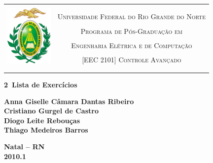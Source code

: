 \begin{titlepage}
\begin{center}

\begin{table}[h]
\centering
\setlength{\arrayrulewidth}{3.5\arrayrulewidth}
    \begin{tabular}{cc}
    \hline\\
    \multirow{5}{*}{\includegraphics[height=3cm]{imgs/ufrn}}&\\
    & \textsc{Universidade Federal do Rio Grande do Norte}\\
    & \textsc{Programa de Pós-Graduação em}\\
    & \textsc{Engenharia Elétrica e de Computação}\\
    & \textsc{[EEC 2101] Controle Avançado}\\
    &\\
    &\\
    \hline
    \end{tabular}
\end{table}


\vfill

\LARGE
\textbf{2\textordfeminine\ Lista de Exercícios}

\vfill

\normalsize
\textbf{Anna Giselle Câmara Dantas Ribeiro}\\
\textbf{Cristiano Gurgel de Castro}\\
\textbf{Diogo Leite Rebouças}\\
\textbf{Thiago Medeiros Barros}

\vfill
\textbf{Natal -- RN\\
        2010.1 }

\end{center}
\end{titlepage}
